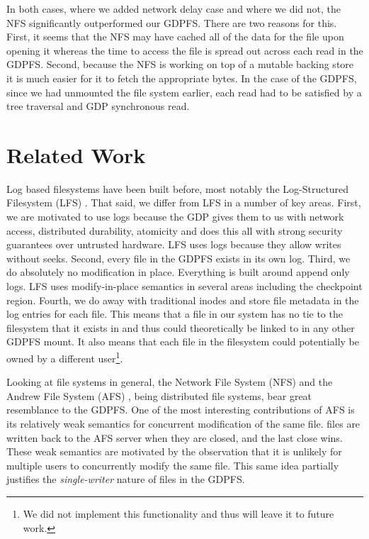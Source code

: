 \documentclass{acm_proc_article-sp}
\begin{document}
In both cases, where we added network delay case and where we did not, the NFS significantly outperformed our GDPFS. There are two reasons for this. First, it seems that the NFS may have cached all of the data for the file upon opening it whereas the time to access the file is spread out across each read in the GDPFS. Second, because the NFS is working on top of a mutable backing store it is much easier for it to fetch the appropriate bytes. In the case of the GDPFS, since we had unmounted the file system earlier, each read had to be satisfied by a tree traversal and GDP synchronous read.

\section{Related Work}
Log based filesystems have been built before, most notably the Log-Structured Filesystem (LFS) \cite{LFS}. That said, we differ from LFS in a number of key areas. First, we are motivated to use logs because the GDP gives them to us with network access, distributed durability, atomicity and does this all with strong security guarantees over untrusted hardware. LFS uses logs because they allow writes without seeks. Second, every file in the GDPFS exists in its own log. Third, we do absolutely no modification in place. Everything is built around append only logs. LFS uses modify-in-place semantics in several areas including the checkpoint region. Fourth, we do away with traditional inodes and store file metadata in the log entries for each file. This means that a file in our system has no tie to the filesystem that it exists in and thus could theoretically be linked to in any other GDPFS mount. It also means that each file in the filesystem could potentially be owned by a different user\footnote{We did not implement this functionality and thus will leave it to future work.}.

Looking at file systems in general, the Network File System (NFS) \cite{NFS} and the Andrew File System (AFS) \cite{AFS}, being distributed file systems, bear great resemblance to the GDPFS. One of the most interesting contributions of AFS is its relatively weak semantics for concurrent modification of the same file. files are written back to the AFS server when they are closed, and the last close wins. These weak semantics are motivated by the observation that it is unlikely for multiple users to concurrently modify the same file. This same idea partially justifies the \emph{single-writer} nature of files in the GDPFS.
\end{document}
